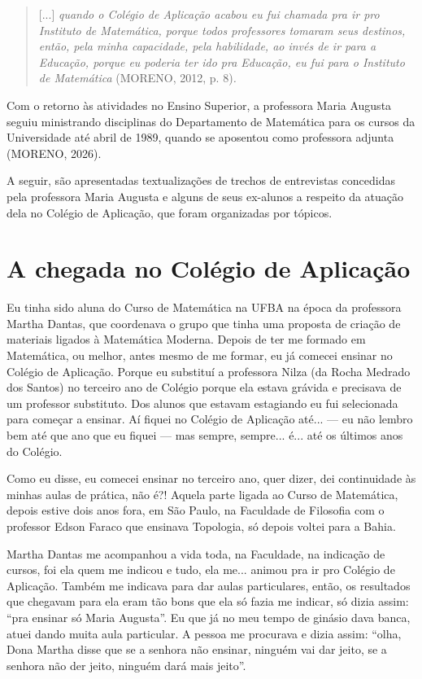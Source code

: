 \documentclass{hipatia}
\begin{document}
\begin{quote}
{[}...{]} \emph{quando o Colégio de Aplicação acabou eu fui chamada pra
ir pro Instituto de Matemática, porque todos professores tomaram seus
destinos, então, pela minha capacidade, pela habilidade, ao invés de ir
para a Educação, porque eu poderia ter ido pra Educação, eu fui para o
Instituto de Matemática} (MORENO, 2012, p. 8)\emph{.}
\end{quote}

Com o retorno às atividades no Ensino Superior, a professora Maria
Augusta seguiu ministrando disciplinas do Departamento de Matemática
para os cursos da Universidade até abril de 1989, quando se aposentou
como professora adjunta (MORENO, 2026).

A seguir, são apresentadas textualizações de trechos de entrevistas
concedidas pela professora Maria Augusta e alguns de seus ex-alunos a
respeito da atuação dela no Colégio de Aplicação, que foram organizadas
por tópicos.

\itshape

\section{A chegada no Colégio de Aplicação}

Eu tinha sido aluna do Curso de Matemática na UFBA na época da
professora Martha Dantas, que coordenava o grupo que tinha uma proposta
de criação de materiais ligados à Matemática Moderna. Depois de ter me
formado em Matemática, ou melhor, antes mesmo de me formar, eu já
comecei ensinar no Colégio de Aplicação. Porque eu substituí a
professora Nilza (da Rocha Medrado dos Santos) no terceiro ano de
Colégio porque ela estava grávida e precisava de um professor
substituto. Dos alunos que estavam estagiando eu fui selecionada para
começar a ensinar. Aí fiquei no Colégio de Aplicação até... --- eu não
lembro bem até que ano que eu fiquei --- mas sempre, sempre... é... até
os últimos anos do Colégio.

Como eu disse, eu comecei ensinar no terceiro ano, quer dizer, dei
continuidade às minhas aulas de prática, não é?! Aquela parte ligada ao
Curso de Matemática, depois estive dois anos fora, em São Paulo, na
Faculdade de Filosofia com o professor Edson Faraco que ensinava
Topologia, só depois voltei para a Bahia.

Martha Dantas me acompanhou a vida toda, na Faculdade, na indicação de
cursos, foi ela quem me indicou e tudo, ela me... animou pra ir pro
Colégio de Aplicação. Também me indicava para dar aulas particulares,
então, os resultados que chegavam para ela eram tão bons que ela só
fazia me indicar, só dizia assim: ``pra ensinar só Maria Augusta''. Eu
que já no meu tempo de ginásio dava banca, atuei dando muita aula
particular. A pessoa me procurava e dizia assim: ``olha, Dona Martha
disse que se a senhora não ensinar, ninguém vai dar jeito, se a senhora
não der jeito, ninguém dará mais jeito''.
\end{document}
